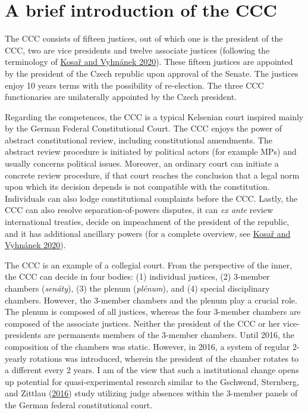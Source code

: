 \documentclass[
  11pt,
]{article}
\begin{document}
\hypertarget{a-brief-introduction-of-the-ccc}{%
\section{A brief introduction of the
CCC}\label{a-brief-introduction-of-the-ccc}}

The CCC consists of fifteen justices, out of which one is the president
of the CCC, two are vice presidents and twelve associate justices
(following the terminology of
\protect\hyperlink{ref-kosarConstitutionalCourtCzechia2020}{Kosař and
Vyhnánek 2020}). These fifteen justices are appointed by the president
of the Czech republic upon approval of the Senate. The justices enjoy 10
years terms with the possibility of re-election. The three CCC
functionaries are unilaterally appointed by the Czech president.

Regarding the competences, the CCC is a typical Kelsenian court inspired
mainly by the German Federal Constitutional Court. The CCC enjoys the
power of abstract constitutional review, including constitutional
amendments. The abstract review procedure is initiated by political
actors (for example MPs) and usually concerns political issues.
Moreover, an ordinary court can initiate a concrete review procedure, if
that court reaches the conclusion that a legal norm upon which its
decision depends is not compatible with the constitution. Individuals
can also lodge constitutional complaints before the CCC. Lastly, the CCC
can also resolve separation-of-powers disputes, it can \emph{ex ante}
review international treaties, decide on impeachment of the president of
the republic, and it has additional ancillary powers (for a complete
overview, see
\protect\hyperlink{ref-kosarConstitutionalCourtCzechia2020}{Kosař and
Vyhnánek 2020}).

The CCC is an example of a collegial court. From the perspective of the
inner, the CCC can decide in four bodies: (1) individual justices, (2)
3-member chambers (\emph{senáty}), (3) the plenum (\emph{plénum}), and
(4) special disciplinary chambers. However, the 3-member chambers and
the plenum play a crucial role. The plenum is composed of all justices,
whereas the four 3-member chambers are composed of the associate
justices. Neither the president of the CCC or her vice-presidents are
permanents members of the 3-member chambers. Until 2016, the composition
of the chambers was static. However, in 2016, a system of regular
2-yearly rotations was introduced, wherein the president of the chamber
rotates to a different every 2 years. I am of the view that such a
institutional change opens up potential for quasi-experimental research
similar to the Gschwend, Sternberg, and Zittlau
(\protect\hyperlink{ref-gschwendAreJudgesPolitical2016}{2016}) study
utilizing judge absences within the 3-member panels of the German
federal constitutional court.
\end{document}

